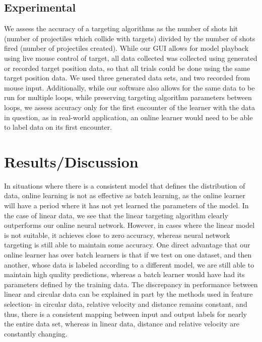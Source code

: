 \documentclass[11pt,letterpaper]{article}
\begin{document}
\subsection{Experimental}
We assess the accuracy of a targeting algorithms as the number of shots hit (number of projectiles which collide with targets) divided by the number of shots fired (number of projectiles created). While our GUI allows for model playback using live mouse control of target, all data collected was collected using generated or recorded target position data, so that all trials could be done using the same target position data. We used three generated data sets, and two recorded from mouse input. Additionally, while our software also allows for the same data to be run for multiple loops, while preserving targeting algorithm parameters between loops, we assess accuracy only for the first encounter of the learner with the data in question, as in real-world application, an online learner would need to be able to label data on its first encounter.

\section{Results/Discussion}
In situations where there is a consistent model that defines the distribution of data, online learning is not as effective as batch learning, as the online learner will have a period where it has not yet learned the parameters of the model. In the case of linear data, we see that the linear targeting algorithm clearly outperforms our online neural network. However, in cases where the linear model is not suitable, it achieves close to zero accuracy, whereas neural network targeting is still able to maintain some accuracy. One direct advantage that our online learner has over batch learners is that if we test on one dataset, and then another, whose data is labeled according to a different model, we are still able to maintain high quality predictions, whereas a batch learner would have had its parameters defined by the training data. The discrepancy in performance between linear and circular data can be explained in part by the methods used in feature selection- in circular data, relative velocity and distance remains constant, and thus, there is a consistent mapping between input and output labels for nearly the entire data set, whereas in linear data, distance and relative velocity are constantly changing.
\end{document}
